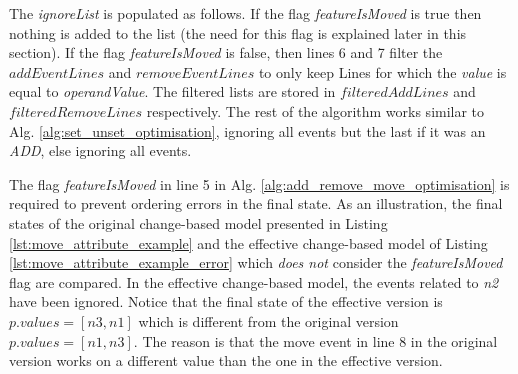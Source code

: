 \documentclass[12pt, a4paper]{report} \usepackage[titletoc]{appendix}
\begin{document}
The \emph{ignoreList} is populated as follows. If the flag \emph{featureIsMoved} is true then nothing is added to the list (the need for this flag is explained later in this section). If the flag \emph{featureIsMoved} is false, then lines 6 and 7 filter the $addEventLines$ and $removeEventLines$ to only keep Lines for which the \emph{value} is equal to \emph{operandValue}. The filtered lists are stored in $filteredAddLines$ and $filteredRemoveLines$ respectively. The rest of the algorithm works similar to Alg. \ref{alg:set_unset_optimisation}, ignoring all events but the last if it was an \emph{ADD}, else ignoring all events. 

The flag \emph{featureIsMoved} in line 5 in Alg. \ref{alg:add_remove_move_optimisation} is required to prevent ordering errors in the final state. As an illustration, the final states of the original change-based model presented in Listing  \ref{lst:move_attribute_example} and the effective change-based model of Listing \ref{lst:move_attribute_example_error} which \emph{does not} consider the \emph{featureIsMoved} flag are compared. In the effective change-based model, the events related to \emph{n2} have been ignored. Notice that the final state of the effective version is $p.values = [n3, n1]$  which is different from the original version $p.values = [n1, n3]$. The reason is that the move event in line 8 in the original version works on a different value than the one in the effective version.
\end{document}
